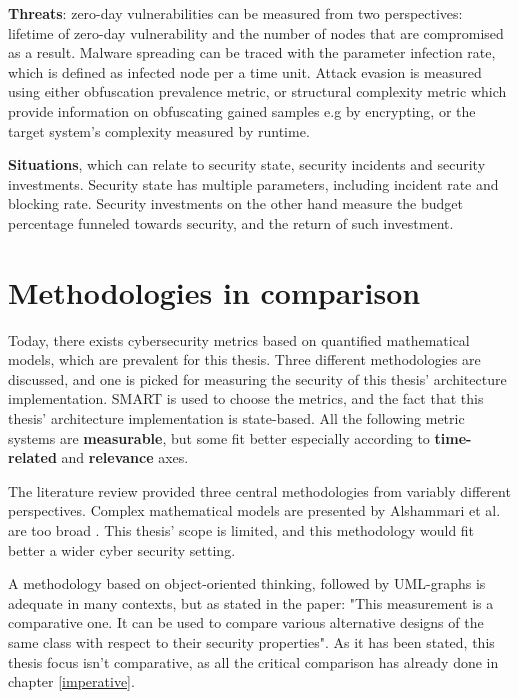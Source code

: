 \textbf{Threats}: zero-day vulnerabilities can be measured from two
perspectives: lifetime of zero-day vulnerability and the number of
nodes that are compromised as a result. Malware spreading can be
traced with the parameter infection rate, which is defined as infected
node per a time unit. Attack evasion is measured using either
obfuscation prevalence metric, or structural complexity metric which
provide information on obfuscating gained samples e.g by encrypting,
or the target system's complexity measured by
runtime. \cite{pendleton2016survey, ramos2017model}

\textbf{Situations}, which can relate to security state, security
incidents and security investments. Security state has multiple
parameters, including incident rate and blocking rate. Security
investments on the other hand measure the budget percentage funneled
towards security, and the return of such
investment. \cite{pendleton2016survey}

\section{Methodologies in comparison} \label{whyqueries}

Today, there exists cybersecurity metrics based on quantified
mathematical models, which are prevalent for this thesis. Three
different methodologies are discussed, and one is picked for measuring
the security of this thesis' architecture implementation. SMART is
used to choose the metrics, and the fact that this thesis'
architecture implementation is state-based. All the following metric
systems are \textbf{measurable}, but some fit better especially
according to \textbf{time-related} and \textbf{relevance} axes.

The literature review provided three central methodologies from
variably different perspectives. Complex mathematical models are
presented by Alshammari et al. are too broad
\cite{alshammari2009security}. This thesis' scope is limited, and this
methodology would fit better a wider cyber security setting.

A methodology based on object-oriented thinking, followed by
UML-graphs is adequate in many contexts, but as stated in the paper:
"This measurement is a comparative one. It can be used to compare
various alternative designs of the same class with respect to their
security properties". As it has been stated, this thesis focus isn't
comparative, as all the critical comparison has already done in
chapter \ref{imperative}.

